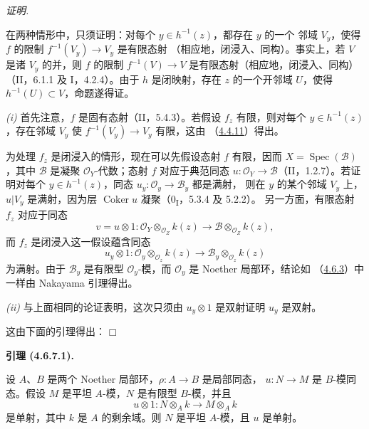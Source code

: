 \documentclass[UTF8,fontset=none,11pt,oneside,openany]{ctexbook}
\providecommand{\square}{\mdlgwhtsquare}
\newenvironment{lemma}[1][]{%
  \par\medskip\noindent\textbf{引理 (#1).}\ %
}{\par}
\newenvironment{proof}{%
  \par\smallskip\noindent\textit{证明.}\ %
}{\hfill$\square$\par}
\newcommand{\oldpage}[2][]{%
  \hypertarget{ega-source-page-#1-#2}{}%
  \marginnote{\scriptsize\textbf{#1}~|~#2}\ignorespaces}
\let\EGAOriginalLabel\label
\renewcommand{\label}[1]{\phantomsection\EGAOriginalLabel{#1}}
\begin{document}
\begin{proof}
在两种情形中，只须证明：对每个 $y\in h^{-1}(z)$，都存在 $y$ 的一个
邻域 $V_y$，使得 $f$ 的限制 $f^{-1}(V_y)\to V_y$ 是有限态射
（相应地，闭浸入、同构）。事实上，若 $V$ 是诸 $V_y$ 的并，则 $f$
的限制 $f^{-1}(V)\to V$ 是有限态射（相应地，闭浸入、同构）
（II，6.1.1 及 I，4.2.4）。由于 $h$ 是闭映射，存在 $z$ 的一个开邻域
$U$，使得 $h^{-1}(U)\subset V$，命题遂得证。

\noindent\textit{(i)} 首先注意，$f$ 是固有态射（II，5.4.3）。若假设
$f_z$ 有限，则对每个 $y\in h^{-1}(z)$，存在邻域 $V_y$ 使
$f^{-1}(V_y)\to V_y$ 有限，这由
（\hyperref[III.4.4.11-fr]{4.4.11}）得出。

\oldpage[III]{143}

为处理 $f_z$ 是闭浸入的情形，现在可以先假设态射 $f$ 有限，因而
$X=\operatorname{Spec}(\mathcal B)$，其中 $\mathcal B$ 是凝聚
$\mathcal O_Y$-代数；态射 $f$ 对应于典范同态
$u:\mathcal O_Y\to\mathcal B$（II，1.2.7）。若证明对每个
$y\in h^{-1}(z)$，同态 $u_y:\mathcal O_y\to\mathcal B_y$ 都是满射，
则在 $y$ 的某个邻域 $V_y$ 上，$u|V_y$ 是满射，因为层
$\operatorname{Coker}u$ 凝聚（0\textsubscript{I}，5.3.4 及 5.2.2）。
另一方面，有限态射 $f_z$ 对应于同态
\[
v=u\otimes1:
\mathcal O_Y\otimes_{\mathcal O_Z}k(z)
\longrightarrow
\mathcal B\otimes_{\mathcal O_Z}k(z),
\]
而 $f_z$ 是闭浸入这一假设蕴含同态
\[
u_y\otimes1:
\mathcal O_y\otimes_{\mathcal O_z}k(z)
\longrightarrow
\mathcal B_y\otimes_{\mathcal O_z}k(z)
\]
为满射。由于 $\mathcal B_y$ 是有限型 $\mathcal O_y$-模，而
$\mathcal O_y$ 是 Noether 局部环，结论如
（\hyperref[III.4.6.3-fr]{4.6.3}）中一样由 Nakayama 引理得出。

\noindent\textit{(ii)} 与上面相同的论证表明，这次只须由
$u_y\otimes1$ 是双射证明 $u_y$ 是双射。

这由下面的引理得出：
\end{proof}

\begin{lemma}[4.6.7.1]
\label{III.4.6.7.1-fr}
设 $A$、$B$ 是两个 Noether 局部环，$\rho:A\to B$ 是局部同态，
$u:N\to M$ 是 $B$-模同态。假设 $M$ 是平坦 $A$-模，$N$ 是有限型
$B$-模，并且
\[
u\otimes1:N\otimes_Ak\longrightarrow M\otimes_Ak
\]
是单射，其中 $k$ 是 $A$ 的剩余域。则 $N$ 是平坦 $A$-模，且 $u$
是单射。
\end{lemma}
\end{document}
